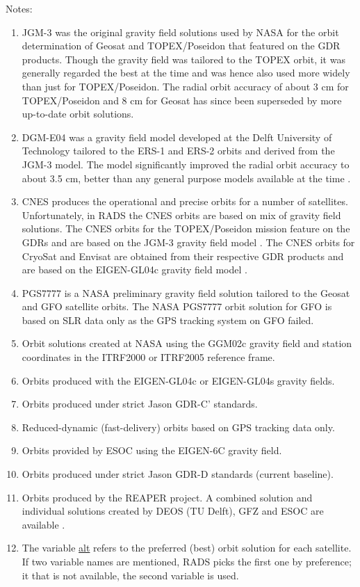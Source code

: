 \documentclass[a4paper,11pt,openany,natbib]{thesis}
\makeatletter
\newcommand\var[1]{\url{#1}\index{variables!#1@\protect\url{#1}}}
\makeatother
\begin{document}
Notes:
\begin{enumerate}
\item JGM-3 \citep{tapley1996} was the original gravity field solutions used by NASA for the orbit determination of Geosat and TOPEX/Poseidon that featured on the GDR products. Though the gravity field was tailored to the TOPEX orbit, it was generally regarded the best at the time and was hence also used more widely than just for TOPEX/Poseidon. The radial orbit accuracy of about 3 cm for TOPEX/Poseidon and 8 cm for Geosat has since been superseded by more up-to-date orbit solutions.\label{item:alt_jgm3}
\item DGM-E04 was a gravity field model developed at the Delft University of Technology tailored to the ERS-1 and ERS-2 orbits and derived from the JGM-3 model. The model significantly improved the radial orbit accuracy to about 3.5 cm, better than any general purpose models available at the time \citep{scharroo1998a}.\label{item:alt_dgme04}
\item CNES produces the operational and precise orbits for a number of satellites. Unfortunately, in RADS the CNES orbits are based on mix of gravity field solutions. The CNES orbits for the TOPEX/Poseidon mission feature on the GDRs and are based on the JGM-3 gravity field model \citep{tapley1996}. The CNES orbits for CryoSat and Envisat are obtained from their respective GDR products and are based on the EIGEN-GL04c gravity field model \citep{ablain2008}.\label{item:alt_cnes}
\item PGS7777 is a NASA preliminary gravity field solution tailored to the Geosat and GFO satellite orbits. The NASA PGS7777 orbit solution for GFO \citep{lemoine2006a} is based on SLR data only as the GPS tracking system on GFO failed.\label{item:alt_pgs7777}
\item Orbit solutions created at NASA using the GGM02c gravity field and station coordinates in the ITRF2000 or ITRF2005 reference frame.\label{item:alt_ggm02c}
\item Orbits produced with the EIGEN-GL04c or EIGEN-GL04s gravity fields.\label{item:alt_eiggl04s}
\item Orbits produced under strict Jason GDR-C' standards.\label{item:alt_gdrcp}
\item Reduced-dynamic (fast-delivery) orbits based on GPS tracking data only.\label{item:alt_gps}
\item Orbits provided by ESOC using the EIGEN-6C gravity field.\label{item:alt_eig6}
\item Orbits produced under strict Jason GDR-D standards (current baseline).\label{item:alt_gdrd}
\item Orbits produced by the REAPER project. A combined solution and individual solutions created by DEOS (TU Delft), GFZ and ESOC are available \citep{rudenko2011}.\label{item:alt_reaper}
\item The variable \var{alt} refers to the preferred (best) orbit solution for each satellite. If two variable names are mentioned, RADS picks the first one by preference; it that is not available, the second variable is used.\label{item:alt}
\end{enumerate}
\end{document}

